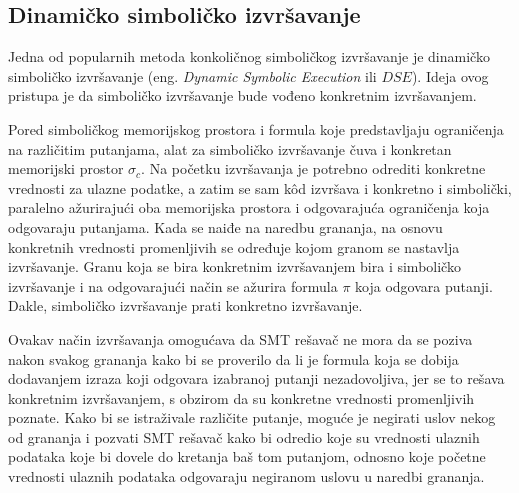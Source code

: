 \documentclass[12pt,oneside]{memoir}
\begin{document}
\subsection{Dinamičko simboličko izvršavanje}
Jedna od popularnih metoda konkoličnog simboličkog izvršavanje je dinamičko simboličko izvršavanje (eng. \textit{Dynamic Symbolic Execution} ili $DSE$). Ideja ovog pristupa je da simboličko izvršavanje bude vođeno konkretnim izvršavanjem. 

Pored simboličkog memorijskog prostora i formula koje predstavljaju ograničenja na različitim putanjama, alat za simboličko izvršavanje čuva i konkretan memorijski prostor $\sigma_c$. Na početku izvršavanja je potrebno odrediti konkretne vrednosti za ulazne podatke, a zatim se sam k\^od izvršava i konkretno i simbolički, paralelno ažurirajući oba memorijska prostora i odgovarajuća ograničenja koja odgovaraju putanjama. Kada se naiđe na naredbu grananja, na osnovu konkretnih vrednosti promenljivih se određuje kojom granom se nastavlja izvršavanje. Granu koja se bira konkretnim izvršavanjem bira i simboličko izvršavanje i na odgovarajući način se ažurira formula $\pi$ koja odgovara putanji. Dakle, simboličko izvršavanje prati konkretno izvršavanje. 

Ovakav način izvršavanja omogućava da SMT rešavač ne mora da se poziva nakon svakog grananja kako bi se proverilo da li je formula koja se dobija dodavanjem izraza koji odgovara izabranoj putanji nezadovoljiva, jer se to rešava konkretnim izvršavanjem, s obzirom da su konkretne vrednosti promenljivih poznate. Kako bi se istraživale različite putanje, moguće je negirati uslov nekog od grananja i pozvati SMT rešavač kako bi odredio koje su vrednosti ulaznih podataka koje bi dovele do kretanja baš tom putanjom, odnosno koje početne vrednosti ulaznih podataka odgovaraju negiranom uslovu u naredbi grananja. 
\end{document}
